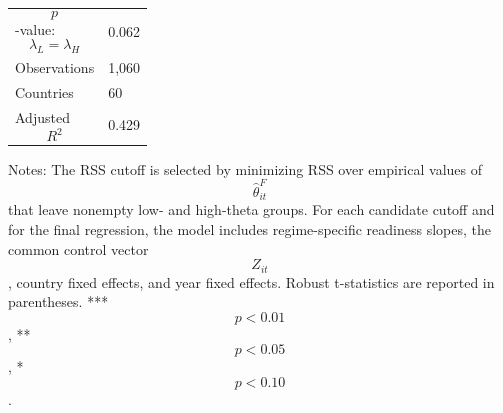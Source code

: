 \begin{table}[H]
\begin{threeparttable}
\begin{tabularx}{\textwidth}{lY}
$$p$$-value: $$\lambda_L=\lambda_H$$ & 0.062 \\
Observations & 1,060 \\
Countries & 60 \\
Adjusted $$R^2$$ & 0.429 \\
\bottomrule
\end{tabularx}
\begin{tablenotes}[flushleft]\footnotesize
\item Notes: The RSS cutoff is selected by minimizing RSS over empirical values of $$\widehat{\theta}^{F}_{it}$$ that leave nonempty low- and high-theta groups. For each candidate cutoff and for the final regression, the model includes regime-specific readiness slopes, the common control vector $$Z_{it}$$, country fixed effects, and year fixed effects. Robust t-statistics are reported in parentheses. *** $$p<0.01$$, ** $$p<0.05$$, * $$p<0.10$$.
\end{tablenotes}
\end{threeparttable}
\end{table}
